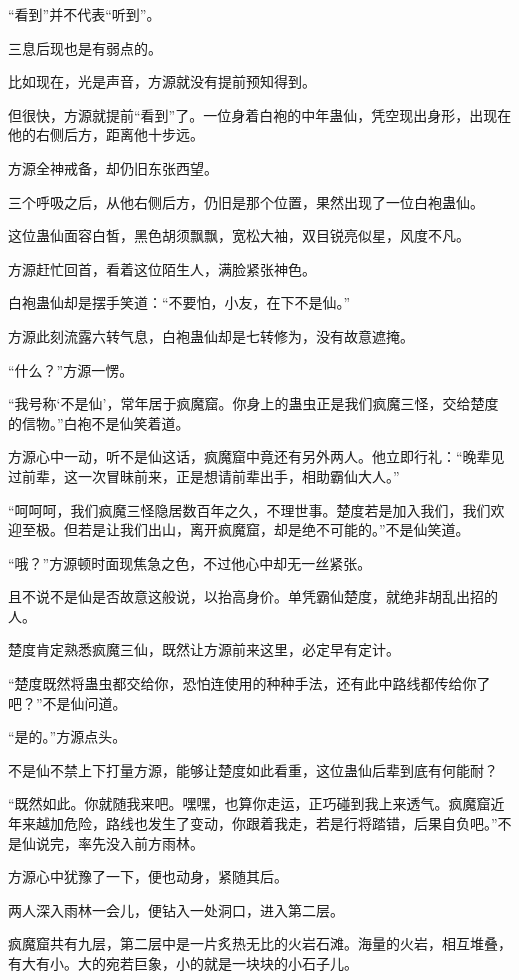 \begin{this_body}
“看到”并不代表“听到”。

三息后现也是有弱点的。

比如现在，光是声音，方源就没有提前预知得到。

但很快，方源就提前“看到”了。一位身着白袍的中年蛊仙，凭空现出身形，出现在他的右侧后方，距离他十步远。

方源全神戒备，却仍旧东张西望。

三个呼吸之后，从他右侧后方，仍旧是那个位置，果然出现了一位白袍蛊仙。

这位蛊仙面容白皙，黑色胡须飘飘，宽松大袖，双目锐亮似星，风度不凡。

方源赶忙回首，看着这位陌生人，满脸紧张神色。

白袍蛊仙却是摆手笑道：“不要怕，小友，在下不是仙。”

方源此刻流露六转气息，白袍蛊仙却是七转修为，没有故意遮掩。

“什么？”方源一愣。

“我号称‘不是仙’，常年居于疯魔窟。你身上的蛊虫正是我们疯魔三怪，交给楚度的信物。”白袍不是仙笑着道。

方源心中一动，听不是仙这话，疯魔窟中竟还有另外两人。他立即行礼：“晚辈见过前辈，这一次冒昧前来，正是想请前辈出手，相助霸仙大人。”

“呵呵呵，我们疯魔三怪隐居数百年之久，不理世事。楚度若是加入我们，我们欢迎至极。但若是让我们出山，离开疯魔窟，却是绝不可能的。”不是仙笑道。

“哦？”方源顿时面现焦急之色，不过他心中却无一丝紧张。

且不说不是仙是否故意这般说，以抬高身价。单凭霸仙楚度，就绝非胡乱出招的人。

楚度肯定熟悉疯魔三仙，既然让方源前来这里，必定早有定计。

“楚度既然将蛊虫都交给你，恐怕连使用的种种手法，还有此中路线都传给你了吧？”不是仙问道。

“是的。”方源点头。

不是仙不禁上下打量方源，能够让楚度如此看重，这位蛊仙后辈到底有何能耐？

“既然如此。你就随我来吧。嘿嘿，也算你走运，正巧碰到我上来透气。疯魔窟近年来越加危险，路线也发生了变动，你跟着我走，若是行将踏错，后果自负吧。”不是仙说完，率先没入前方雨林。

方源心中犹豫了一下，便也动身，紧随其后。

两人深入雨林一会儿，便钻入一处洞口，进入第二层。

疯魔窟共有九层，第二层中是一片炙热无比的火岩石滩。海量的火岩，相互堆叠，有大有小。大的宛若巨象，小的就是一块块的小石子儿。


\end{this_body}
